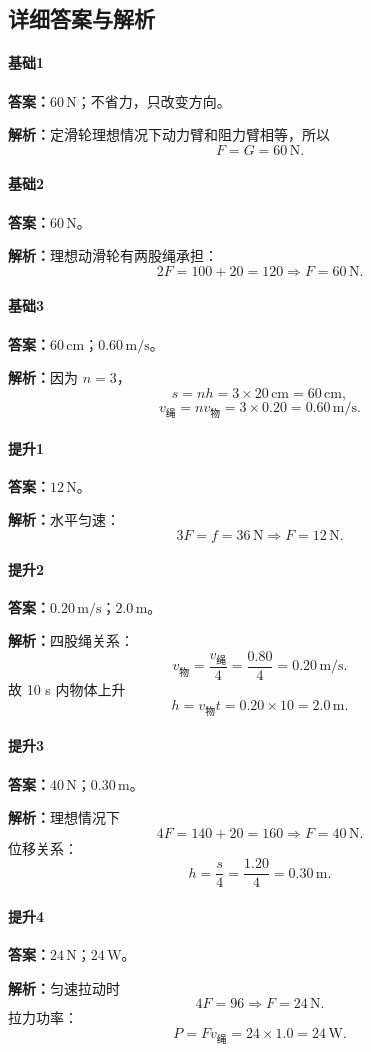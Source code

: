 \documentclass[12pt,a4paper]{ctexart}
\newcommand{\Ans}[1]{\par\noindent\textbf{答案：}#1\par}
\newcommand{\Sol}[1]{\par\noindent\textbf{解析：}#1\par}
\begin{document}
\subsection{详细答案与解析}

\paragraph{基础1}
\Ans{$60\,\mathrm{N}$；不省力，只改变方向。}
\Sol{定滑轮理想情况下动力臂和阻力臂相等，所以
\[
F=G=60\,\mathrm{N}.
\]}

\paragraph{基础2}
\Ans{$60\,\mathrm{N}$。}
\Sol{理想动滑轮有两股绳承担：
\[
2F=100+20=120 \Rightarrow F=60\,\mathrm{N}.
\]}

\paragraph{基础3}
\Ans{$60\,\mathrm{cm}$；$0.60\,\mathrm{m/s}$。}
\Sol{因为 $n=3$，
\[
s=nh=3\times 20\,\mathrm{cm}=60\,\mathrm{cm},
\]
\[
v_{\text{绳}}=nv_{\text{物}}=3\times 0.20=0.60\,\mathrm{m/s}.
\]}

\paragraph{提升1}
\Ans{$12\,\mathrm{N}$。}
\Sol{水平匀速：
\[
3F=f=36\,\mathrm{N}\Rightarrow F=12\,\mathrm{N}.
\]}

\paragraph{提升2}
\Ans{$0.20\,\mathrm{m/s}$；$2.0\,\mathrm{m}$。}
\Sol{四股绳关系：
\[
v_{\text{物}}=\frac{v_{\text{绳}}}{4}=\frac{0.80}{4}=0.20\,\mathrm{m/s}.
\]
故 10 s 内物体上升
\[
h=v_{\text{物}}t=0.20\times 10=2.0\,\mathrm{m}.
\]}

\paragraph{提升3}
\Ans{$40\,\mathrm{N}$；$0.30\,\mathrm{m}$。}
\Sol{理想情况下
\[
4F=140+20=160 \Rightarrow F=40\,\mathrm{N}.
\]
位移关系：
\[
h=\frac{s}{4}=\frac{1.20}{4}=0.30\,\mathrm{m}.
\]}

\paragraph{提升4}
\Ans{$24\,\mathrm{N}$；$24\,\mathrm{W}$。}
\Sol{匀速拉动时
\[
4F=96 \Rightarrow F=24\,\mathrm{N}.
\]
拉力功率：
\[
P=Fv_{\text{绳}}=24\times 1.0 =24\,\mathrm{W}.
\]}
\end{document}
